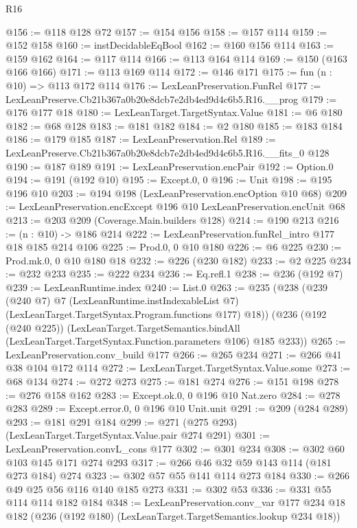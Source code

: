 \begin{lexlean}{R16}
\begin{coremodule}
@156 := @118 @128 @72
@157 := @154 @156
@158 := @157 @114
@159 := @152 @158
@160 := instDecidableEqBool
@162 := @160 @156 @114
@163 := @159 @162
@164 := @117 @114
@166 := @113 @164 @114
@169 := @150 (@163 @166 @166)
@171 := @113 @169 @114
@172 := @146 @171
@175 := fun (n : @10) => @113 @172 @114
@176 := LexLeanPreservation.FunRel
@177 := LexLeanPreserve.Cb21b367a0b20e8dcb7e2db4ed9d4c6b5.R16.__prog
@179 := @176 @177 @18
@180 := LexLeanTarget.TargetSyntax.Value
@181 := @6 @180
@182 := @68 @128
@183 := @181 @182
@184 := @2 @180
@185 := @183 @184
@186 := @179 @185
@187 := LexLeanPreservation.Rel
@189 := LexLeanPreserve.Cb21b367a0b20e8dcb7e2db4ed9d4c6b5.R16.__fits_0 @128
@190 := @187 @189
@191 := LexLeanPreservation.encPair
@192 := Option.{0}
@194 := @191 (@192 @10)
@195 := Except.{0, 0}
@196 := Unit
@198 := @195 @196 @10
@203 := @194 @198 (LexLeanPreservation.encOption @10 @68)
@209 := LexLeanPreservation.encExcept @196 @10 LexLeanPreservation.encUnit @68
@213 := @203 @209 (Coverage.Main.builders @128)
@214 := @190 @213
@216 := (n : @10) -> @186 @214
@222 := LexLeanPreservation.funRel_intro @177 @18 @185 @214 @106
@225 := Prod.{0, 0} @10 @180
@226 := @6 @225
@230 := Prod.mk.{0, 0} @10 @180 @18
@232 := @226 (@230 @182)
@233 := @2 @225
@234 := @232 @233
@235 := @222 @234
@236 := Eq.refl.{1}
@238 := @236 (@192 @7)
@239 := LexLeanRuntime.index
@240 := List.{0}
@263 := @235
    (@238
      (@239
        (@240 @7)
        @7
        (LexLeanRuntime.instIndexableList @7)
        (LexLeanTarget.TargetSyntax.Program.functions @177)
        @18))
    (@236
      (@192 (@240 @225))
      (LexLeanTarget.TargetSemantics.bindAll
        (LexLeanTarget.TargetSyntax.Function.parameters @106)
        @185
        @233))
@265 := LexLeanPreservation.conv_build @177
@266 := @265 @234
@271 := @266 @41 @38 @104 @172 @114
@272 := LexLeanTarget.TargetSyntax.Value.some
@273 := @68 @134
@274 := @272 @273
@275 := @181 @274
@276 := @151 @198
@278 := @276 @158 @162
@283 := Except.ok.{0, 0} @196 @10 Nat.zero
@284 := @278 @283
@289 := Except.error.{0, 0} @196 @10 Unit.unit
@291 := @209 (@284 @289)
@293 := @181 @291 @184
@299 := @271 (@275 @293) (LexLeanTarget.TargetSyntax.Value.pair @274 @291)
@301 := LexLeanPreservation.convL_cons @177
@302 := @301 @234
@308 := @302 @60 @103 @145 @171 @274 @293
@317 := @266 @46 @32 @59 @143 @114 (@181 @273 @184) @274
@323 := @302 @57 @55 @141 @114 @273 @184
@330 := @266 @49 @25 @56 @116 @140 @185 @273
@331 := @302 @53
@336 := @331 @55 @114 @114 @182 @184
@348 := LexLeanPreservation.conv_var
    @177
    @234
    @18
    @182
    (@236 (@192 @180) (LexLeanTarget.TargetSemantics.lookup @234 @18))

\end{coremodule}
\end{lexlean}
